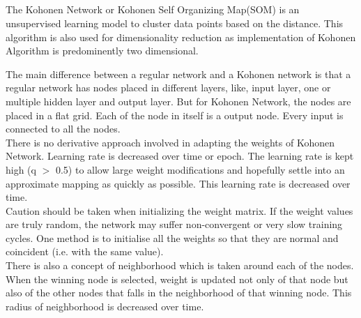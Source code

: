 \documentclass{article}
\begin{document}
   \subsection{}
    \begin{flushleft}
        \noindent
        \large{
        The Kohonen Network or Kohonen Self Organizing Map(SOM) is an unsupervised learning model to cluster data points based on the distance. This algorithm is also used for dimensionality reduction as implementation of Kohonen Algorithm is predominently two dimensional. 
        
        The main difference between a regular network and a Kohonen network is that a regular network has nodes placed in different layers, like, input layer, one or multiple hidden layer and output layer. But for Kohonen Network, the nodes are placed in a flat grid.  Each of the node in itself is a output node. Every input is connected to all the nodes.\\
        
        There is no derivative approach involved in adapting the weights of Kohonen Network. Learning rate is decreased over time or epoch. The learning rate is kept high (q $>$ 0.5) to allow large weight modifications and hopefully settle into an approximate mapping as quickly as possible. This learning rate is decreased over time.\\
        
        Caution should be taken when initializing the weight matrix. If the weight values are truly random, the network may suffer non-convergent or very slow training cycles. One method is to initialise all the weights so that they are normal and coincident (i.e. with the same value).\\
        
        There is also a concept of neighborhood which is taken around each of the nodes. When the winning node is selected, weight is updated not only of that node but also of the other nodes that falls in the neighborhood of that winning node. This radius of neighborhood is decreased over time. \cite{Beale_Jackson_2017}
}

  
    \end{flushleft}
\end{document}
